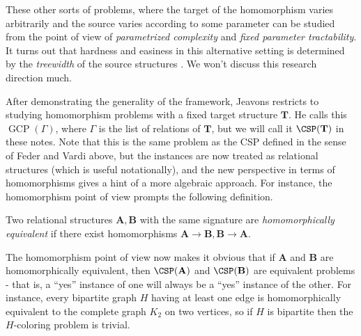 These other sorts of problems, where the target of the homomorphism varies arbitrarily and the source varies according to some parameter can be studied from the point of view of \emph{parametrized complexity} and \emph{fixed parameter tractability}. It turns out that hardness and easiness in this alternative setting is determined by the \emph{treewidth} of the source structures \cite{treewidth-homomorphism}. We won't discuss this research direction much.

After demonstrating the generality of the framework, Jeavons \cite{jeavons} restricts to studying homomorphism problems with a fixed target structure $\mathbf{T}$. He calls this $\operatorname{GCP}(\Gamma)$, where $\Gamma$ is the list of relations of $\mathbf{T}$, but we will call it $\CSP(\mathbf{T})$ in these notes. Note that this is the same problem as the CSP defined in the sense of Feder and Vardi above, but the instances are now treated as relational structures (which is useful notationally), and the new perspective in terms of homomorphisms gives a hint of a more algebraic approach. For instance, the homomorphism point of view prompts the following definition.

\begin{defn} Two relational structures $\mathbf{A}, \mathbf{B}$ with the same signature are \emph{homomorphically equivalent} if there exist homomorphisms $\mathbf{A} \rightarrow \mathbf{B}, \mathbf{B} \rightarrow \mathbf{A}$.
\end{defn}

The homomorphism point of view now makes it obvious that if $\mathbf{A}$ and $\mathbf{B}$ are homomorphically equivalent, then $\CSP(\mathbf{A})$ and $\CSP(\mathbf{B})$ are equivalent problems - that is, a ``yes'' instance of one will always be a ``yes'' instance of the other. For instance, every bipartite graph $H$ having at least one edge is homomorphically equivalent to the complete graph $K_2$ on two vertices, so if $H$ is bipartite then the $H$-coloring problem is trivial.

